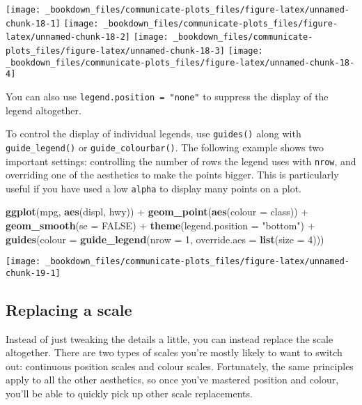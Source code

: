 \documentclass[]{book}
\newenvironment{Shaded}{\begin{snugshade}}{\end{snugshade}}
\newcommand{\KeywordTok}[1]{\textcolor[rgb]{0.13,0.29,0.53}{\textbf{{#1}}}}
\newcommand{\DataTypeTok}[1]{\textcolor[rgb]{0.13,0.29,0.53}{{#1}}}
\newcommand{\DecValTok}[1]{\textcolor[rgb]{0.00,0.00,0.81}{{#1}}}
\newcommand{\StringTok}[1]{\textcolor[rgb]{0.31,0.60,0.02}{{#1}}}
\newcommand{\OtherTok}[1]{\textcolor[rgb]{0.56,0.35,0.01}{{#1}}}
\newcommand{\NormalTok}[1]{{#1}}
\begin{document}
\texttt{[image: \_bookdown\_files/communicate-plots\_files/figure-latex/unnamed-chunk-18-1]}
\texttt{[image: \_bookdown\_files/communicate-plots\_files/figure-latex/unnamed-chunk-18-2]}
\texttt{[image: \_bookdown\_files/communicate-plots\_files/figure-latex/unnamed-chunk-18-3]}
\texttt{[image: \_bookdown\_files/communicate-plots\_files/figure-latex/unnamed-chunk-18-4]}

You can also use \texttt{legend.position\ =\ "none"} to suppress the
display of the legend altogether.

To control the display of individual legends, use \texttt{guides()}
along with \texttt{guide\_legend()} or \texttt{guide\_colourbar()}. The
following example shows two important settings: controlling the number
of rows the legend uses with \texttt{nrow}, and overriding one of the
aesthetics to make the points bigger. This is particularly useful if you
have used a low \texttt{alpha} to display many points on a plot.

\begin{Shaded}
\begin{Highlighting}[]
\KeywordTok{ggplot}\NormalTok{(mpg, }\KeywordTok{aes}\NormalTok{(displ, hwy)) +}
\StringTok{  }\KeywordTok{geom_point}\NormalTok{(}\KeywordTok{aes}\NormalTok{(}\DataTypeTok{colour =} \NormalTok{class)) +}
\StringTok{  }\KeywordTok{geom_smooth}\NormalTok{(}\DataTypeTok{se =} \OtherTok{FALSE}\NormalTok{) +}
\StringTok{  }\KeywordTok{theme}\NormalTok{(}\DataTypeTok{legend.position =} \StringTok{"bottom"}\NormalTok{) +}
\StringTok{  }\KeywordTok{guides}\NormalTok{(}\DataTypeTok{colour =} \KeywordTok{guide_legend}\NormalTok{(}\DataTypeTok{nrow =} \DecValTok{1}\NormalTok{, }\DataTypeTok{override.aes =} \KeywordTok{list}\NormalTok{(}\DataTypeTok{size =} \DecValTok{4}\NormalTok{)))}
\end{Highlighting}
\end{Shaded}

\begin{center}\texttt{[image: \_bookdown\_files/communicate-plots\_files/figure-latex/unnamed-chunk-19-1]} \end{center}

\subsection{Replacing a scale}\label{replacing-a-scale}

Instead of just tweaking the details a little, you can instead replace
the scale altogether. There are two types of scales you're mostly likely
to want to switch out: continuous position scales and colour scales.
Fortunately, the same principles apply to all the other aesthetics, so
once you've mastered position and colour, you'll be able to quickly pick
up other scale replacements.
\end{document}
